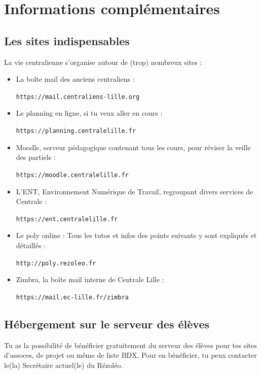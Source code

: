 \documentclass[12pt]{article}
\begin{document}
{\begin{description}
  \end{description}

\section{Informations complémentaires}

  \subsection{Les sites indispensables}
    La vie centralienne s’organise autour de (trop) nombreux sites :
    \newline
    \begin{itemize}
      \item La boîte mail des anciens centraliens :
      \begin{center}
	\verb|https://mail.centraliens-lille.org|
      \end{center}
    \item Le planning en ligne, si tu veux aller en cours :
    \begin{center}
      \verb|https://planning.centralelille.fr|
    \end{center}
    \item Moodle, serveur pédagogique contenant tous les cours, pour réviser la veille des partiels :
    \begin{center}
      \verb|https://moodle.centralelille.fr|
    \end{center}
    \item L’ENT, Environnement Numérique de Travail, regroupant divers services de Centrale :
    \begin{center}
      \verb|https://ent.centralelille.fr|
    \end{center}
    \item Le poly online : Tous les tutos et infos des points suivants y sont expliqués et détaillés :
    \begin{center}
      \verb|http://poly.rezoleo.fr|
    \end{center}
    \item Zimbra, la boîte mail interne de Centrale Lille :
    \begin{center}
      \verb|https://mail.ec-lille.fr/zimbra|
    \end{center}
    \end{itemize}
  \subsection{Hébergement sur le serveur des élèves}
    Tu as la possibilité de bénéficier gratuitement du serveur des élèves pour tes sites d’assoces, de projet ou même de liste BDX. Pour en bénéficier, tu peux contacter le(la) Secrétaire actuel(le) du Rézoléo.
}
\end{document}
